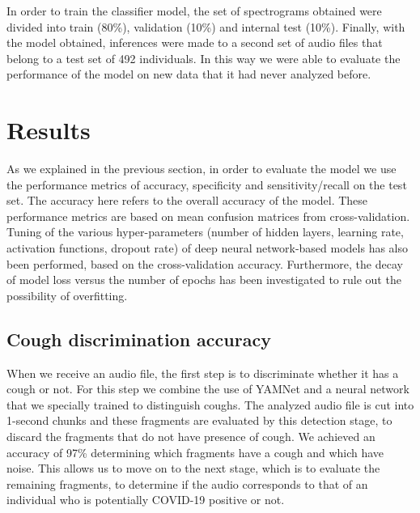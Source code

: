 \documentclass{nle}
\begin{document}
In order to train the classifier model, the set of spectrograms obtained were divided into train (80\%), validation (10\%) and internal test (10\%). Finally, with the model obtained, inferences were made to a second set of audio files that belong to a test set of 492 individuals. In this way we were able to evaluate the performance of the model on new data that it had never analyzed before.



\section{Results}

As we explained in the previous section, in order to evaluate the model we use the performance metrics of accuracy, specificity and sensitivity/recall on the test set. The accuracy here refers to the overall accuracy of the model. These performance metrics are based on mean confusion matrices from cross-validation. Tuning of the various hyper-parameters (number of hidden layers, learning rate, activation functions, dropout rate) of deep neural network-based models has also been performed, based on the cross-validation accuracy. Furthermore, the decay of model loss versus the number of epochs has been investigated to rule out the possibility of overfitting.

\subsection{Cough discrimination accuracy}

When we receive an audio file, the first step is to discriminate whether it has a cough or not. For this step we combine the use of YAMNet and a neural network that we specially trained to distinguish coughs. The analyzed audio file is cut into 1-second chunks and these fragments are evaluated by this detection stage, to discard the fragments that do not have presence of cough. We achieved an accuracy of 97\% determining which fragments have a cough and which have noise. This allows us to move on to the next stage, which is to evaluate the remaining fragments, to determine if the audio corresponds to that of an individual who is potentially COVID-19 positive or not.
\end{document}
